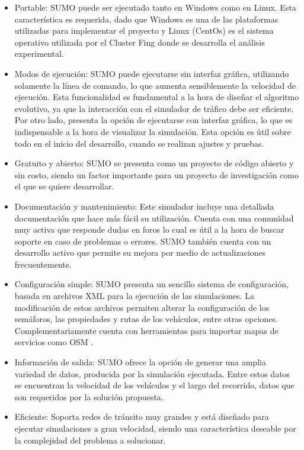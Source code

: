 \begin{itemize}
	\item Portable: SUMO puede ser ejecutado tanto en Windows como en Linux. Esta característica es requerida, dado que Windows es una de las plataformas utilizadas para implementar el proyecto y Linux (CentOs) es el sistema operativo utilizada por el Cluster Fing donde se desarrolla el análisis experimental.
	
	\item Modos de ejecución: SUMO puede ejecutarse sin interfaz gráfica, utilizando solamente la línea de comando, lo que aumenta sensiblemente la velocidad de ejecución. Esta funcionalidad es fundamental a la hora de diseñar el algoritmo evolutivo, ya que la interacción con el simulador de tráfico debe ser eficiente. Por otro lado, presenta la opción de ejecutarse con interfaz gráfica, lo que es indispensable a la hora de visualizar la simulación. Esta opción es útil sobre todo en el inicio del desarrollo, cuando se realizan ajustes y pruebas.
	
	\item Gratuito y abierto: SUMO se presenta como un proyecto de código abierto y sin costo, siendo un factor importante para un proyecto de investigación como el que se quiere desarrollar. 
	
	\item Documentación y mantenimiento: Este simulador incluye una detallada documentación que hace más fácil su utilización. Cuenta con una comunidad muy activa que responde dudas en foros lo cual es útil a la hora de buscar soporte en caso de problemas o errores. SUMO también cuenta con un desarrollo activo que permite su mejora por medio de actualizaciones frecuentemente.
	
	\item Configuración simple: SUMO presenta un sencillo sistema de configuración, basada en archivos XML para la ejecución de las simulaciones. La modificación de estos archivos permiten alterar la configuración de los semáforos, las propiedades y rutas de los vehículos, entre otras opciones. Complementariamente cuenta con herramientas para importar mapas de servicios como OSM \citep{OSM}.
	
	\item Información de salida: SUMO ofrece la opción de generar una amplia variedad de datos, producida por la simulación ejecutada. Entre estos datos se encuentran la velocidad de los vehículos y el largo del recorrido, datos que son requeridos por la solución propuesta.
	
	\item Eficiente: Soporta redes de tránsito muy grandes y está diseñado para ejecutar simulaciones a gran velocidad, siendo una característica deseable por la complejidad del problema a solucionar.
	
\end{itemize}


